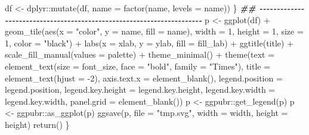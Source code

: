 \documentclass[
]{article}
\newenvironment{Shaded}{\begin{snugshade}}{\end{snugshade}}
\newcommand{\AttributeTok}[1]{\textcolor[rgb]{0.77,0.63,0.00}{#1}}
\newcommand{\DecValTok}[1]{\textcolor[rgb]{0.00,0.00,0.81}{#1}}
\newcommand{\DocumentationTok}[1]{\textcolor[rgb]{0.56,0.35,0.01}{\textbf{\textit{#1}}}}
\newcommand{\FunctionTok}[1]{\textcolor[rgb]{0.00,0.00,0.00}{#1}}
\newcommand{\NormalTok}[1]{#1}
\newcommand{\OtherTok}[1]{\textcolor[rgb]{0.56,0.35,0.01}{#1}}
\newcommand{\SpecialCharTok}[1]{\textcolor[rgb]{0.00,0.00,0.00}{#1}}
\newcommand{\StringTok}[1]{\textcolor[rgb]{0.31,0.60,0.02}{#1}}
\begin{document}
\begin{Shaded}
\begin{Highlighting}[]
\NormalTok{      df }\OtherTok{\textless{}{-}}\NormalTok{ dplyr}\SpecialCharTok{::}\FunctionTok{mutate}\NormalTok{(df, }\AttributeTok{name =} \FunctionTok{factor}\NormalTok{(name, }\AttributeTok{levels =}\NormalTok{ name))}
\NormalTok{    \}}
    \DocumentationTok{\#\# {-}{-}{-}{-}{-}{-}{-}{-}{-}{-}{-}{-}{-}{-}{-}{-}{-}{-}{-}{-}{-}{-}{-}{-}{-}{-}{-}{-}{-}{-}{-}{-}{-}{-}{-}{-}{-}{-}{-}{-}{-}{-}{-}{-}{-}{-}{-}{-}{-}{-}{-}{-}{-}{-}{-}{-}{-}{-}{-}{-}{-}{-}{-}{-}{-}{-}{-}{-}{-}{-} }
\NormalTok{    p }\OtherTok{\textless{}{-}} \FunctionTok{ggplot}\NormalTok{(df) }\SpecialCharTok{+}
      \FunctionTok{geom\_tile}\NormalTok{(}\FunctionTok{aes}\NormalTok{(}\AttributeTok{x =} \StringTok{"color"}\NormalTok{, }\AttributeTok{y =}\NormalTok{ name,}
                    \AttributeTok{fill =}\NormalTok{ name),}
                \AttributeTok{width =} \DecValTok{1}\NormalTok{, }\AttributeTok{height =} \DecValTok{1}\NormalTok{, }\AttributeTok{size =} \DecValTok{1}\NormalTok{, }\AttributeTok{color =} \StringTok{"black"}\NormalTok{) }\SpecialCharTok{+}
      \FunctionTok{labs}\NormalTok{(}\AttributeTok{x =}\NormalTok{ xlab, }\AttributeTok{y =}\NormalTok{ ylab, }\AttributeTok{fill =}\NormalTok{ fill\_lab) }\SpecialCharTok{+}
      \FunctionTok{ggtitle}\NormalTok{(title) }\SpecialCharTok{+}
      \FunctionTok{scale\_fill\_manual}\NormalTok{(}\AttributeTok{values =}\NormalTok{ palette) }\SpecialCharTok{+}
      \FunctionTok{theme\_minimal}\NormalTok{() }\SpecialCharTok{+}
      \FunctionTok{theme}\NormalTok{(}\AttributeTok{text =} \FunctionTok{element\_text}\NormalTok{(}\AttributeTok{size =}\NormalTok{ font\_size, }\AttributeTok{face =} \StringTok{"bold"}\NormalTok{, }\AttributeTok{family =} \StringTok{"Times"}\NormalTok{),}
            \AttributeTok{title =} \FunctionTok{element\_text}\NormalTok{(}\AttributeTok{hjust =} \SpecialCharTok{{-}}\DecValTok{2}\NormalTok{),}
            \AttributeTok{axis.text.x =} \FunctionTok{element\_blank}\NormalTok{(),}
            \AttributeTok{legend.position =}\NormalTok{ legend.position,}
            \AttributeTok{legend.key.height =}\NormalTok{ legend.key.height,}
            \AttributeTok{legend.key.width =}\NormalTok{ legend.key.width,}
            \AttributeTok{panel.grid =} \FunctionTok{element\_blank}\NormalTok{())}
\NormalTok{    p }\OtherTok{\textless{}{-}}\NormalTok{ ggpubr}\SpecialCharTok{::}\FunctionTok{get\_legend}\NormalTok{(p)}
\NormalTok{    p }\OtherTok{\textless{}{-}}\NormalTok{ ggpubr}\SpecialCharTok{::}\FunctionTok{as\_ggplot}\NormalTok{(p)}
    \FunctionTok{ggsave}\NormalTok{(p, }\AttributeTok{file =} \StringTok{"tmp.svg"}\NormalTok{, }\AttributeTok{width =}\NormalTok{ width, }\AttributeTok{height =}\NormalTok{ height)}
    \FunctionTok{return}\NormalTok{()}
\NormalTok{  \}}
\end{Highlighting}
\end{Shaded}
\end{document}

